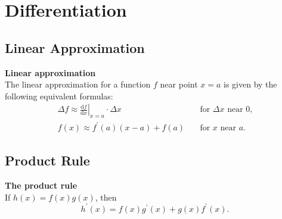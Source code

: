 \chapter{Differentiation}
\section{Linear Approximation}
\textbf{Linear approximation}\\
\indent The linear approximation for a function \(f\) near point \(x=a\) is given by the following equivalent formulas:
\begin{align*}
    \Delta f\approx\left.\frac{\mathrm{d}f}{\mathrm{d}x}\right|_{x=a}\cdot\Delta x & \quad\text{for \(\Delta x\) near \(0\),}\\
        f(x)\approx f^\prime (a)(x-a)+f(a) & \quad\text{for \(x\) near \(a\).}
\end{align*}

\section{Product Rule}
\textbf{The product rule}\\
\indent If \(h(x)=f(x)g(x)\), then
\[
    h^\prime (x)=f(x)g^\prime (x)+g(x)f^\prime (x).
\]

